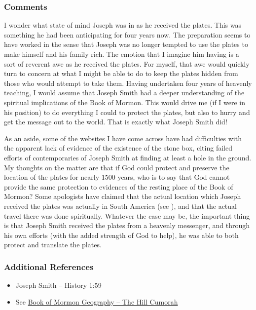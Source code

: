 \documentclass[12pt]{report}
\begin{document}
\subsubsection{Comments\label{js:comments22}}
I wonder what state of mind Joseph was in as he received the plates.  This was something he had been anticipating for four years now.  The preparation seems to have worked in the sense that Joseph was no longer tempted to use the plates to make himself and his family rich.  The emotion that I imagine him having is a sort of reverent awe as he received the plates.  For myself, that awe would quickly turn to concern at what I might be able to do to keep the plates hidden from those who would attempt to take them.  Having undertaken four years of heavenly teaching, I would assume that Joseph Smith had a deeper understanding of the spiritual implications of the Book of Mormon.  This would drive me (if I were in his position) to do everything I could to protect the plates, but also to hurry and get the message out to the world.  That is exactly what Joseph Smith did!

As an aside, some of the websites I have come across have had difficulties with the apparent lack of evidence of the existence of the stone box, citing failed efforts of contemporaries of Joseph Smith at finding at least a hole in the ground.  My thoughts on the matter are that if God could protect and preserve the location of the plates for nearly 1500 years, who is to say that God cannot provide the same protection to evidences of the resting place of the Book of Mormon?  Some apologists have claimed that the actual location which Joseph received the plates was actually in South America (see ), and that the actual travel there was done spiritually.  Whatever the case may be, the important thing is that Joseph Smith received the plates from a heavenly messenger, and through his own efforts (with the added strength of God to help), he was able to both protect and translate the plates.

\subsubsection{Additional References\label{js:references22}}
\begin{itemize}
\item Joseph Smith -- History 1:59
\item See \href{https://www.fairmormon.org/answers/Book_of_Mormon/Geography/New_World/Hill_Cumorah}{Book of Mormon Geography -- The Hill Cumorah}
\end{itemize}
\printindex
\end{document}
